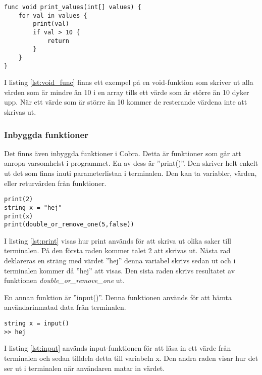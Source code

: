 \documentclass{TDP003mall}
\begin{document}
\begin{lstlisting}[caption=Void-funktion-exempel, label=lst:void_func]
func void print_values(int[] values) {
    for val in values {
        print(val)
        if val > 10 {
            return
        }
    }
}
\end{lstlisting}
I listing \ref{lst:void_func} finns ett exempel på en void-funktion som skriver ut alla värden som är mindre än 10 i en array tills ett värde som är större än 10 dyker upp.
När ett värde som är större än 10 kommer de resterande värdena inte att skrivas ut.

\subsubsection{Inbyggda funktioner}
Det finns även inbyggda funktioner i Cobra.
Detta är funktioner som går att anropa varsomhelst i programmet. En av dess är ''print()''. Den skriver helt enkelt ut det som finns inuti parameterlistan i terminalen. Den kan ta variabler, värden, eller returvärden från funktioner.
\begin{lstlisting}[caption=Print-exempel, label=lst:print]
print(2)
string x = "hej"
print(x)
print(double_or_remove_one(5,false))
\end{lstlisting}
I listing \ref{lst:print} visas hur print används för att skriva ut olika saker till terminalen.
På den första raden kommer talet 2 att skrivas ut.
Nästa rad deklareras en sträng med värdet ''hej'' denna variabel skrivs sedan ut och i terminalen kommer då ''hej'' att visas.
Den sista raden skrivs resultatet av funktionen \emph{double\_or\_remove\_one} ut.

En annan funktion är ''input()''. Denna funktionen används för att hämta användarinmatad data från terminalen. 
\begin{lstlisting}[caption=Input-exempel, label=lst:input]
string x = input()
>> hej
\end{lstlisting}
I listing \ref{lst:input} används input-funktionen för att läsa in ett värde från terminalen och sedan tilldela detta till variabeln x.
Den andra raden visar hur det ser ut i terminalen när användaren matar in värdet.
\end{document}
